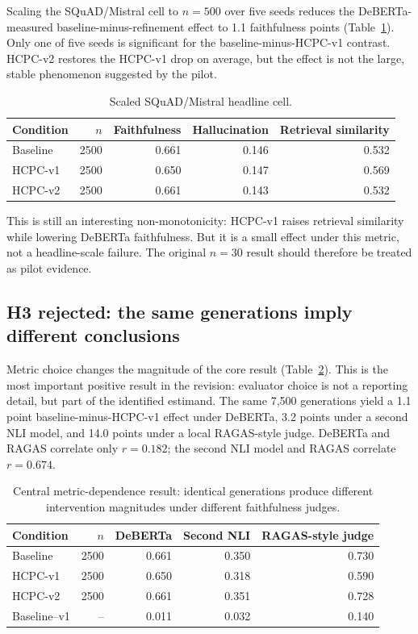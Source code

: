 Scaling the SQuAD/Mistral cell to $n=500$ over five seeds reduces the
DeBERTa-measured baseline-minus-refinement effect to 1.1 faithfulness points
(Table~\ref{tab:scaled}). Only one of five seeds is significant for the
baseline-minus-HCPC-v1 contrast. HCPC-v2 restores the HCPC-v1 drop on average,
but the effect is not the large, stable phenomenon suggested by the pilot.

\begin{table}[H]
\centering
\small
\caption{Scaled SQuAD/Mistral headline cell.}
\label{tab:scaled}
\begin{tabular}{lrrrr}
\toprule
Condition & $n$ & Faithfulness & Hallucination & Retrieval similarity \\
\midrule
Baseline & 2500 & 0.661 & 0.146 & 0.532 \\
HCPC-v1 & 2500 & 0.650 & 0.147 & 0.569 \\
HCPC-v2 & 2500 & 0.661 & 0.143 & 0.532 \\
\bottomrule
\end{tabular}
\end{table}

This is still an interesting non-monotonicity: HCPC-v1 raises retrieval
similarity while lowering DeBERTa faithfulness. But it is a small effect under
this metric, not a headline-scale failure. The original $n=30$ result should
therefore be treated as pilot evidence.

\subsection{H3 rejected: the same generations imply different conclusions}

Metric choice changes the magnitude of the core result
(Table~\ref{tab:metrics}). This is the most important positive result in the
revision: evaluator choice is not a reporting detail, but part of the
identified estimand. The same 7,500 generations yield a 1.1 point
baseline-minus-HCPC-v1 effect under DeBERTa, 3.2 points under a second NLI
model, and 14.0 points under a local RAGAS-style judge. DeBERTa and RAGAS
correlate only $r=0.182$; the second NLI model and RAGAS correlate $r=0.674$.

\begin{table}[H]
\centering
\small
\setlength{\tabcolsep}{7pt}
\caption{Central metric-dependence result: identical generations produce
different intervention magnitudes under different faithfulness judges.}
\label{tab:metrics}
\begin{tabular}{lrrrr}
\toprule
Condition & $n$ & DeBERTa & Second NLI & RAGAS-style judge \\
\midrule
Baseline & 2500 & 0.661 & 0.350 & 0.730 \\
HCPC-v1 & 2500 & 0.650 & 0.318 & 0.590 \\
HCPC-v2 & 2500 & 0.661 & 0.351 & 0.728 \\
\midrule
Baseline--v1 & -- & 0.011 & 0.032 & 0.140 \\
\bottomrule
\end{tabular}
\end{table}

